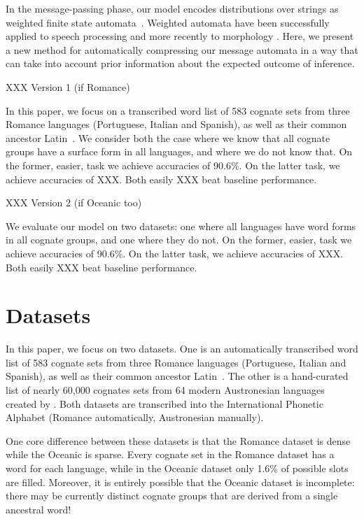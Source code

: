 \documentclass[11pt,a4paper]{article}
\begin{document}
In the message-passing phase, our model encodes distributions over
strings as weighted finite state automata~\cite{mohri09weighted}.
Weighted automata have been successfully applied to speech processing
\cite{Mohri96weightedautomata} and more recently to morphology
\cite{dreyer2009graphical}.  Here, we present a new method for
automatically compressing our message automata in a way that can
take into account prior information about the expected outcome of
inference.

XXX Version 1 (if Romance)

In this paper, we focus on a transcribed word list of 583 cognate
sets from three Romance languages (Portuguese, Italian and Spanish),
as well as their common ancestor Latin~\cite{bouchard07probabilistic}.
We consider both the case where we know that all cognate groups have a
surface form in all languages, and where we do not know that.  On
the former, easier, task we achieve accuracies of 90.6\%. On the
latter task, we achieve accuracies of XXX. Both easily XXX beat
baseline performance.

XXX Version 2 (if Oceanic too)

We evaluate our model on two datasets: one where all languages
have word forms in all cognate groups, and one where they do not.
On the former, easier, task we achieve accuracies of 90.6\%. On the
latter task, we achieve accuracies of XXX. Both easily XXX beat
baseline performance.

\section{Datasets}

In this paper, we focus on two datasets. One is an automatically
transcribed word list of 583 cognate sets from three Romance languages
(Portuguese, Italian and Spanish), as well as their common ancestor
Latin~\cite{bouchard07probabilistic}.  The other is a hand-curated
list of nearly 60,000 cognates sets from 64 modern Austronesian
languages created by . Both datasets are
transcribed into the International Phonetic Alphabet (Romance
automatically, Austronesian manually). 

One core difference between these datasets is that the Romance
dataset is dense while the Oceanic is sparse. Every cognate set in
the Romance dataset has a word for each language, while in the
Oceanic dataset only 1.6\% of possible slots are filled. Moreover,
it is entirely possible that the Oceanic dataset is incomplete:
there may be currently distinct cognate groups that are derived
from a single ancestral word!
\end{document}
